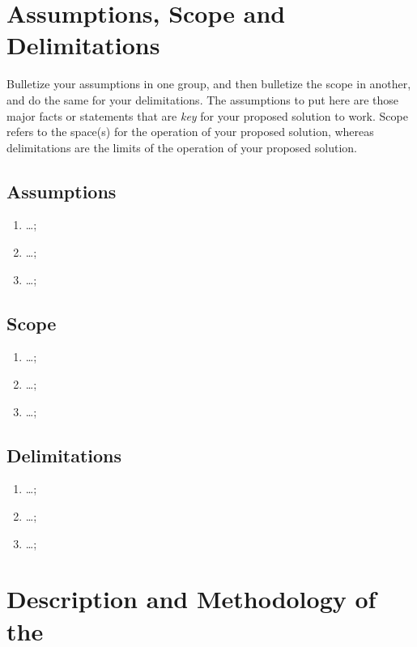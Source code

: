 \graytx{\blindtext}



\section{Assumptions, Scope and Delimitations}

Bulletize your assumptions in one group, and then bulletize the scope in another, and do the same for your delimitations. The assumptions to put here are those major facts or statements that are \textit{key} for your proposed solution to work. Scope refers to the space(s) for the operation of your proposed solution, whereas delimitations are the limits of the operation of your proposed solution.

\subsection{Assumptions}

\begin{enumerate}
	\item \ldots;

	\item \ldots;

	\item \ldots;
\end{enumerate}

\subsection{Scope}
\begin{enumerate}
	\item \ldots;

	\item \ldots;

	\item \ldots;
\end{enumerate}

\subsection{Delimitations}
\begin{enumerate}
	\item \ldots;

	\item \ldots;

	\item \ldots;
\end{enumerate}

\section{Description and Methodology of the \documentType}

